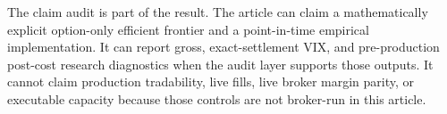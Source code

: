 The claim audit is part of the result. The article can claim a mathematically explicit
option-only efficient frontier and a point-in-time empirical implementation. It can report
gross, exact-settlement VIX, and pre-production post-cost research diagnostics when the
audit layer supports those outputs. It cannot claim production tradability, live fills, live
broker margin parity, or executable capacity because those controls are not broker-run in
this article.
